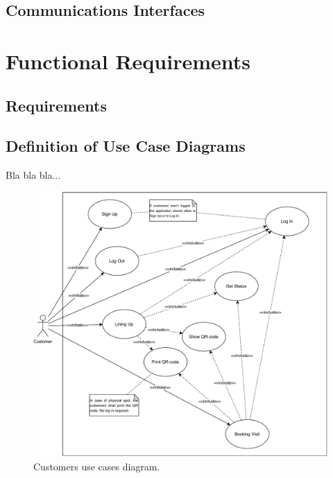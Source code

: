 \subsection{Communications Interfaces}

\section{Functional Requirements}

\subsection{Requirements}

\subsection{Definition of Use Case Diagrams}

Bla bla bla...

\begin{figure}[H]
	\centering
	\includegraphics[width=1.0\textwidth]{images/customers_use_cases_diagram.pdf}
	\caption{Customers use cases diagram.}
	\label{customersUseCasesDiagram}
\end{figure}

